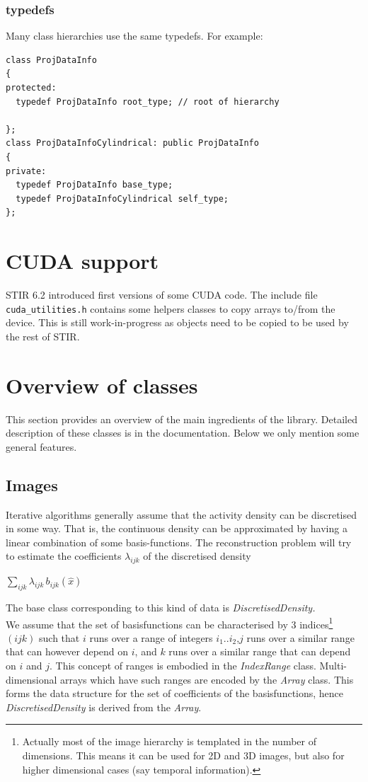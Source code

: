\documentclass{article}
\begin{document}
\subsubsection{typedefs}
Many class hierarchies use the same typedefs. For example:
\begin{verbatim}
class ProjDataInfo
{
protected:
  typedef ProjDataInfo root_type; // root of hierarchy
  
};
class ProjDataInfoCylindrical: public ProjDataInfo
{
private:
  typedef ProjDataInfo base_type;
  typedef ProjDataInfoCylindrical self_type;
};
\end{verbatim}

\section{CUDA support}
STIR 6.2 introduced first versions of some CUDA code. The include file
\texttt{cuda\_utilities.h} contains some helpers classes to copy
arrays to/from the device. This is still work-in-progress as objects
need to be copied to be used by the rest of STIR.

\section{
Overview of classes}

This section provides an overview of the main ingredients of 
the library. Detailed description of these classes is in the documentation. 
Below we only mention some general features.



\subsection{
Images}

Iterative algorithms generally assume that the activity density 
can be discretised in some way. That is, the continuous density 
can be approximated by having a linear combination of some basis-functions. 
The reconstruction problem will try to estimate the coefficients $\lambda_{ijk}$ of 
the discretised density


$\sum_{ ijk}\lambda _{ijk} \,b_{ijk} (\widehat{x})  $

The base class corresponding to this kind of data is \textit{DiscretisedDensity.}\\
We assume that the set of basisfunctions can be characterised 
by 3 indices\footnote{{\small Actually most of the image hierarchy is 
templated in the number of dimensions. This means it can be used 
for 2D and 3D images, but also for higher dimensional cases (say 
temporal information).}} $(ijk)$ such that $i$ runs over a 
range of integers $i_1..i_2$,$j$ runs over a 
similar range that can however depend on $i$, and $k$ runs 
over a similar range that can depend on $i$ and $j$. 
This 
concept of ranges is embodied in the \textit{IndexRange} class. Multi-dimensional 
arrays which have such ranges are encoded by the \textit{Array} class. 
This forms the data structure for the set of coefficients of 
the basisfunctions, hence \textit{DiscretisedDensity} is derived from 
the \textit{Array}.
\end{document}
